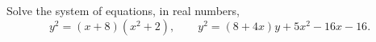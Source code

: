 Solve the system of equations, in real numbers,
\[
y^2=(x+8)\left(x^2+2\right),\qquad y^2=(8+4x)y+5x^2-16x-16 .
\]
